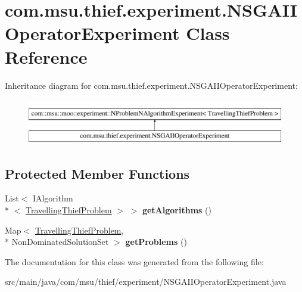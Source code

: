 \hypertarget{classcom_1_1msu_1_1thief_1_1experiment_1_1NSGAIIOperatorExperiment}{\section{com.\-msu.\-thief.\-experiment.\-N\-S\-G\-A\-I\-I\-Operator\-Experiment Class Reference}
\label{classcom_1_1msu_1_1thief_1_1experiment_1_1NSGAIIOperatorExperiment}
}
Inheritance diagram for com.\-msu.\-thief.\-experiment.\-N\-S\-G\-A\-I\-I\-Operator\-Experiment\-:\begin{figure}[H]
\begin{center}
\leavevmode
\includegraphics[height=2.000000cm]{classcom_1_1msu_1_1thief_1_1experiment_1_1NSGAIIOperatorExperiment}
\end{center}
\end{figure}
\subsection*{Protected Member Functions}
\begin{DoxyCompactItemize}
\item 
\hypertarget{classcom_1_1msu_1_1thief_1_1experiment_1_1NSGAIIOperatorExperiment_a24ce271b7118ae4650da4115770d4c06}{List$<$ I\-Algorithm\\*
$<$ \hyperlink{classcom_1_1msu_1_1thief_1_1problems_1_1TravellingThiefProblem}{Travelling\-Thief\-Problem} $>$ $>$ {\bfseries get\-Algorithms} ()}\label{classcom_1_1msu_1_1thief_1_1experiment_1_1NSGAIIOperatorExperiment_a24ce271b7118ae4650da4115770d4c06}

\item 
\hypertarget{classcom_1_1msu_1_1thief_1_1experiment_1_1NSGAIIOperatorExperiment_a929ebb8c067bcad09c305c8aa1c93996}{Map$<$ \hyperlink{classcom_1_1msu_1_1thief_1_1problems_1_1TravellingThiefProblem}{Travelling\-Thief\-Problem}, \\*
Non\-Dominated\-Solution\-Set $>$ {\bfseries get\-Problems} ()}\label{classcom_1_1msu_1_1thief_1_1experiment_1_1NSGAIIOperatorExperiment_a929ebb8c067bcad09c305c8aa1c93996}

\end{DoxyCompactItemize}


The documentation for this class was generated from the following file\-:\begin{DoxyCompactItemize}
\item 
src/main/java/com/msu/thief/experiment/N\-S\-G\-A\-I\-I\-Operator\-Experiment.\-java\end{DoxyCompactItemize}
